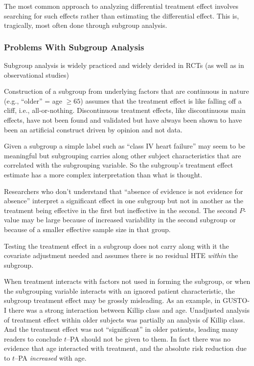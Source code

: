 The most common approach to analyzing differential treatment effect
involves searching for such effects rather than estimating the
differential effect.  This is, tragically, most often done through
subgroup analysis.

\subsubsection{Problems With Subgroup Analysis}
\bi
\item   Subgroup analysis is widely practiced and widely derided in RCTs (as well as in observational studies)
\item Construction of a subgroup from underlying factors that are continuous in nature (e.g., ``older'' = age $\geq 65$) assumes that the treatment effect is like falling off a cliff, i.e., all-or-nothing.  Discontinuous treatment effects, like discontinuous main effects, have not been found and validated but have always been shown to have been an artificial construct driven by opinion and not data.
\item Given a subgroup a simple label such as ``class IV heart failure'' may seem to be meaningful but subgrouping carries along other subject characteristics that are correlated with the subgrouping variable.  So the subgroup's treatment effect estimate has a more complex interpretation than what is thought.
\item Researchers who don't understand that ``absence of evidence is not evidence for absence'' interpret a significant effect in one subgroup but not in another as the treatment being effective in the first but ineffective in the second.  The second $P$-value may be large because of increased variability in the second subgroup or because of a smaller effective sample size in that group.
\item Testing the treatment effect in a subgroup does not carry along with it the covariate adjustment needed and assumes there is no residual HTE \emph{within} the subgroup.
\item When treatment interacts with factors not used in forming the subgroup, or when the subgrouping variable interacts with an ignored patient characteristic, the subgroup treatment effect may be grossly misleading.  As an example, in GUSTO-I there was a strong interaction between Killip class and age.  Unadjusted analysis of treatment effect within older subjects was partially an analysis of Killip class.  And the treatment effect was not ``significant'' in older patients, leading many readers to conclude $t$--PA should not be given to them.  In fact there was no evidence that age interacted with treatment, and the absolute risk reduction due to $t$--PA \emph{increased} with age.
\ei

